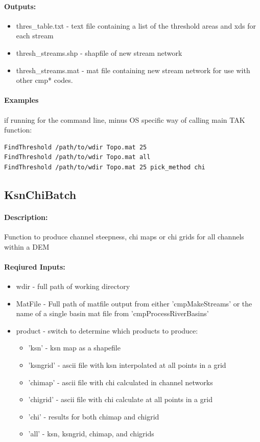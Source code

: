 \paragraph{Outputs:}
\begin{itemize}
\item thres\_table.txt - text file containing a list of the threshold areas and xds for each stream 
\item thresh\_streams.shp - shapfile of new stream network
\item thresh\_streams.mat - mat file containing new stream network for use with other cmp* codes.
\end{itemize}

\paragraph{Examples} if running for the command line, minus OS specific way of calling main TAK function:
\begin{lstlisting}[language=bash]
FindThreshold /path/to/wdir Topo.mat 25
FindThreshold /path/to/wdir Topo.mat all
FindThreshold /path/to/wdir Topo.mat 25 pick_method chi
\end{lstlisting}

\subsection{KsnChiBatch}
\paragraph{Description:}
Function to produce channel steepness, chi maps or chi grids for all channels within a DEM

\paragraph{Reqiured Inputs:}
\begin{itemize}
\item wdir - full path of working directory
\item MatFile - Full path of matfile output from either 'cmpMakeStreams' or the name of a single basin mat file from 'cmpProcessRiverBasins'
\item product - switch to determine which products to produce:
\begin{itemize}
\item 'ksn' - ksn map as a shapefile
\item 'ksngrid' - ascii file with ksn interpolated at all points in a grid
\item 'chimap' - ascii file with chi calculated in channel networks
\item 'chigrid' - ascii file with chi calculate at all points in a grid
\item 'chi' - results for both chimap and chigrid
\item 'all' - ksn, ksngrid, chimap, and chigrids
\end{itemize}
\end{itemize}

